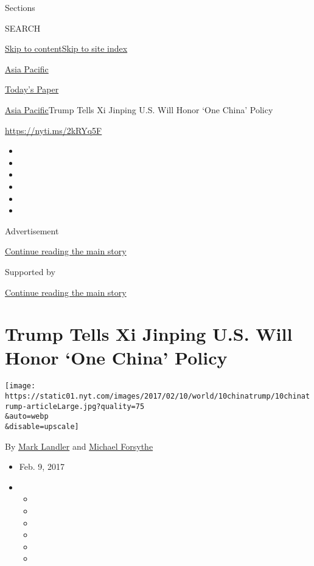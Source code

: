 Sections

SEARCH

\protect\hyperlink{site-content}{Skip to
content}\protect\hyperlink{site-index}{Skip to site index}

\href{https://www.nytimes.com/section/world/asia}{Asia Pacific}

\href{https://myaccount.nytimes.com/auth/login?response_type=cookie\&client_id=vi}{}

\href{https://www.nytimes.com/section/todayspaper}{Today's Paper}

\href{/section/world/asia}{Asia Pacific}\textbar{}Trump Tells Xi Jinping
U.S. Will Honor `One China' Policy

\url{https://nyti.ms/2kRYq5F}

\begin{itemize}
\item
\item
\item
\item
\item
\item
\end{itemize}

Advertisement

\protect\hyperlink{after-top}{Continue reading the main story}

Supported by

\protect\hyperlink{after-sponsor}{Continue reading the main story}

\hypertarget{trump-tells-xi-jinping-us-will-honor-one-china-policy}{%
\section{Trump Tells Xi Jinping U.S. Will Honor `One China'
Policy}\label{trump-tells-xi-jinping-us-will-honor-one-china-policy}}

\texttt{[image: https://static01.nyt.com/images/2017/02/10/world/10chinatrump/10chinatrump-articleLarge.jpg?quality=75\\\&auto=webp\\\&disable=upscale]}

By \href{http://www.nytimes.com/by/mark-landler}{Mark Landler} and
\href{http://www.nytimes.com/by/michael-forsythe}{Michael Forsythe}

\begin{itemize}
\item
  Feb. 9, 2017
\item
  \begin{itemize}
  \item
  \item
  \item
  \item
  \item
  \item
  \end{itemize}
\end{itemize}

